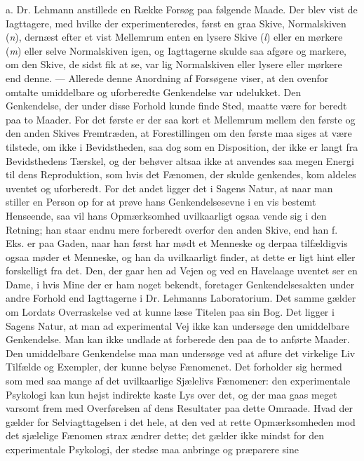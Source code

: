 \documentclass[12pt,a4paper,openany]{book}
\newcommand{\opage}[1]{\marginnote{\footnotesize\textit{[#1]}}}
\begin{document}
a. Dr. Lehmann anstillede en Række Forsøg paa følgende Maade. Der blev vist de
Iagttagere, med hvilke der experimenteredes, først en graa Skive, Normalskiven
(\textit{n}), dernæst efter et vist Mellemrum enten en lysere Skive
(\textit{l}) eller en mørkere (\textit{m}) eller selve Normalskiven igen, og
Iagttagerne skulde saa afgøre og markere, om den Skive, de sidst fik at se, var
lig Normalskiven eller lysere eller mørkere end denne. --- Allerede denne
Anordning af Forsøgene viser, at den ovenfor omtalte umiddelbare og uforberedte
Genkendelse var udelukket. Den Genkendelse, der under disse Forhold kunde finde
Sted, maatte være for%
\setcounter{footnote}{0}%
\opage{30}beredt paa to Maader. For det første er der saa kort et Mellemrum
mellem den første og den anden Skives Fremtræden, at Forestillingen om den
første maa siges at være tilstede, om ikke i Bevidstheden, saa dog som en
Disposition, der ikke er langt fra Bevidsthedens Tærskel, og der behøver altsaa
ikke at anvendes saa megen Energi til dens Reproduktion, som hvis det Fænomen,
der skulde genkendes, kom aldeles uventet og uforberedt. For det andet ligger
det i Sagens Natur, at naar man stiller en Person op for at prøve hans
Genkendelsesevne i en vis bestemt Henseende, saa vil hans Opmærksomhed
uvilkaarligt ogsaa vende sig i den Retning; han staar endnu mere forberedt
overfor den anden Skive, end han f. Eks. er paa Gaden, naar han først har mødt
et Menneske og derpaa tilfældigvis ogsaa møder et Menneske, og han da
uvilkaarligt finder, at dette er ligt hint eller forskelligt fra det. Den, der
gaar hen ad Vejen og ved en Havelaage uventet ser en Dame, i hvis Mine der er
ham noget bekendt, foretager Genkendelsesakten under andre Forhold end
Iagttagerne i Dr. Lehmanns Laboratorium. Det samme gælder om Lordats
Overraskelse ved at kunne læse Titelen paa sin Bog. Det ligger i Sagens Natur,
at man ad experimental Vej ikke kan undersøge den umiddelbare Genkendelse. Man
kan ikke undlade at forberede den paa de to anførte Maader. Den umiddelbare
Genkendelse maa man undersøge ved at aflure det virkelige Liv Tilfælde og
Exempler, der kunne belyse Fænomenet. Det forholder sig hermed som med saa
mange af det uvilkaarlige Sjælelivs Fænomener: den experimentale Psykologi kan
kun højst indirekte kaste Lys over det, og der maa gaas meget varsomt frem med
Overførelsen af dens Resultater paa dette Omraade. Hvad der gælder for
Selviagttagelsen i det hele, at den ved at rette Opmærksomheden mod det
sjælelige Fænomen strax ændrer dette; det gælder ikke mindst for den
experimentale Psykologi, der stedse maa anbringe og præparere sine
\end{document}
